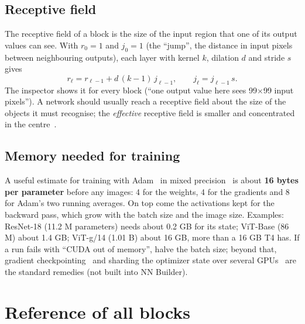 \documentclass[11pt,a4paper]{article}
\begin{document}
\subsection{Receptive field}
The receptive field of a block is the size of the input region that one of its output values can see. With $r_0=1$ and $j_0=1$ (the
``jump'', the distance in input pixels between neighbouring outputs), each layer with kernel $k$, dilation $d$ and stride $s$ gives
\begin{equation}
  r_\ell = r_{\ell-1} + d\,(k-1)\, j_{\ell-1}, \qquad j_\ell = j_{\ell-1}\, s .
\end{equation}
The inspector shows it for every block (``one output value here sees 99$\times$99 input pixels''). A network should usually reach a
receptive field about the size of the objects it must recognise; the \emph{effective} receptive field is smaller and concentrated in the
centre~\cite{luo2017erf}.

\subsection{Memory needed for training}
A useful estimate for training with Adam~\cite{kingma2014adam} in mixed precision~\cite{micikevicius2017mixed} is about
\textbf{16 bytes per parameter} before any images: 4 for the weights, 4 for the gradients and 8 for Adam's two running averages. On top
come the activations kept for the backward pass, which grow with the batch size and the image size. Examples: ResNet-18 (11.2 M
parameters) needs about 0.2 GB for its state; ViT-Base (86 M) about 1.4 GB; ViT-g/14 (1.01 B) about 16 GB, more than a 16 GB T4 has. If a
run fails with ``CUDA out of memory'', halve the batch size; beyond that, gradient checkpointing~\cite{chen2016checkpoint} and sharding
the optimizer state over several GPUs~\cite{rajbhandari2019zero} are the standard remedies (not built into NN Builder).

\section{Reference of all blocks}
\label{sec:blocks}
\end{document}
